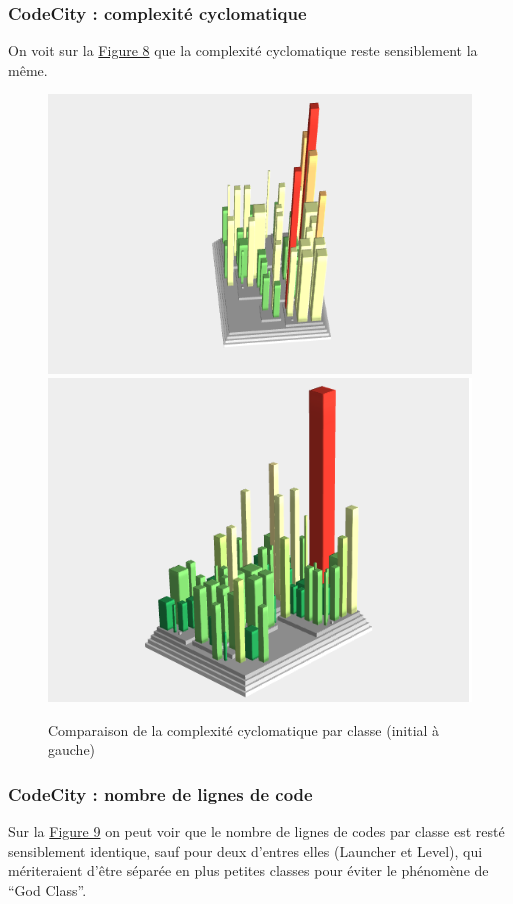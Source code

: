 \documentclass[a4paper,12pt]{report} %
\begin{document}
\subsubsection{CodeCity : complexité cyclomatique}
On voit sur la \hyperref[figure8]{Figure 8} que la complexité cyclomatique reste sensiblement
la même.

\begin{figure}[!h]
\includegraphics[scale=0.5]{ressources/final_initial_cyclomatic}\includegraphics[scale=0.5]{ressources/final_new_cyclomatic}\caption{Comparaison de la complexité cyclomatique par classe (initial à gauche)}\label{figure8}


\end{figure}

\subsubsection{CodeCity : nombre de lignes de code}
Sur la \hyperref[figure9]{Figure 9} on peut voir que le nombre de lignes de codes par
classe est resté sensiblement identique, sauf pour deux d'entres elles
(Launcher et Level), qui mériteraient d'être séparée en plus petites
classes pour éviter le phénomène de ``God Class''.
\end{document}
